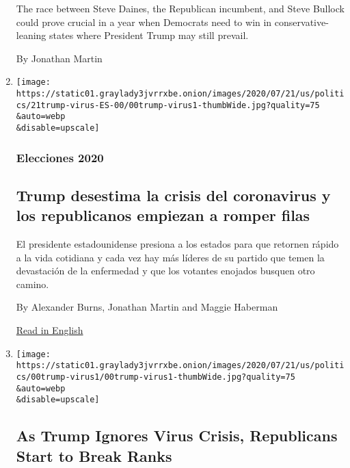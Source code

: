 \begin{enumerate}
  The race between Steve Daines, the Republican incumbent, and Steve
  Bullock could prove crucial in a year when Democrats need to win in
  conservative-leaning states where President Trump may still prevail.

  By Jonathan Martin
\item
  \href{/es/2020/07/21/espanol/estados-unidos/donald-trump-coronavirus-republicanos.html}{}

  \texttt{[image: https://static01.graylady3jvrrxbe.onion/images/2020/07/21/us/politics/21trump-virus-ES-00/00trump-virus1-thumbWide.jpg?quality=75\\\&auto=webp\\\&disable=upscale]}

  \hypertarget{elecciones-2020}{%
  \subsubsection{Elecciones 2020}\label{elecciones-2020}}

  \hypertarget{trump-desestima-la-crisis-del-coronavirus-y-los-republicanos-empiezan-a-romper-filas}{%
  \subsection{Trump desestima la crisis del coronavirus y los
  republicanos empiezan a romper
  filas}\label{trump-desestima-la-crisis-del-coronavirus-y-los-republicanos-empiezan-a-romper-filas}}

  El presidente estadounidense presiona a los estados para que retornen
  rápido a la vida cotidiana y cada vez hay más líderes de su partido
  que temen la devastación de la enfermedad y que los votantes enojados
  busquen otro camino.

  By Alexander Burns, Jonathan Martin and Maggie Haberman

  \href{https://www.nytimes3xbfgragh.onion/2020/07/19/us/politics/republicans-contradict-trump-coronavirus.html}{Read
  in English}
\item
  \href{/2020/07/19/us/politics/republicans-contradict-trump-coronavirus.html}{}

  \texttt{[image: https://static01.graylady3jvrrxbe.onion/images/2020/07/21/us/politics/00trump-virus1/00trump-virus1-thumbWide.jpg?quality=75\\\&auto=webp\\\&disable=upscale]}

  \hypertarget{as-trump-ignores-virus-crisis-republicans-start-to-break-ranks}{%
  \subsection{As Trump Ignores Virus Crisis, Republicans Start to Break
  Ranks}\label{as-trump-ignores-virus-crisis-republicans-start-to-break-ranks}}


\end{enumerate}
